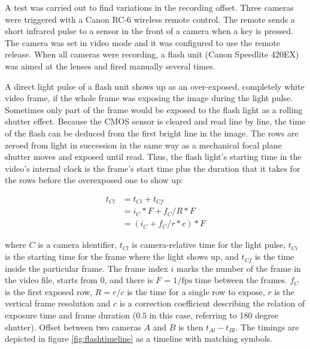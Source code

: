 
A test was carried out to find variations in the recording offset.
Three cameras were triggered with a Canon RC-6 wireless remote control.
The remote sends a short infrared pulse to a sensor in the front of a camera when a key is pressed.
The camera was set in video mode and it was configured to use the remote release.
When all cameras were recording, a flash unit (Canon Speedlite 420EX) was aimed at the lenses and fired manually several times.


A direct light pulse of a flash unit shows up as an over-exposed, completely white video frame, if the whole frame was exposing the image during the light pulse.
Sometimes only part of the frame would be exposed to the flash light as a rolling shutter effect.
Because the CMOS sensor is cleared and read line by line, the time of the flash can be deduced from the first bright line in the image.
The rows are zeroed from light in succession in the same way as a mechanical focal plane shutter moves and exposed until read.
Thus, the flash light's starting time in the video's internal clock is the frame's start time plus the duration that it takes for the rows before the overexposed one to show up:

\begin{align} \label{timingcalib}
t_{Cl} &= t_{Ci} + t_{Cf} \\
&= i_C * F + f_C / R * F \\
&= (i_C + f_C / r * c) * F
\end{align}

where $C$ is a camera identifier, $t_{Cl}$ is camera-relative time for the light pulse, $t_{Ci}$ is the starting time for the frame where the light shows up, and $t_{Cf}$ is the time inside the particular frame.
The frame index $i$ marks the number of the frame in the video file, starts from 0, and there is $F$ = $1/\text{fps}$ time between the frames.
$f_C$ is the first exposed row, $R = r / c$ is the time for a single row to expose, $r$ is the vertical frame resolution and $c$ is a correction coefficient describing the relation of exposure time and frame duration ($0.5$ in this case, referring to 180 degree shutter).
Offset between two cameras $A$ and $B$ is then $t_{Al} - t_{Bl}$.
The timings are depicted in figure \ref{fig:flashtimeline} as a timeline with matching symbols.

